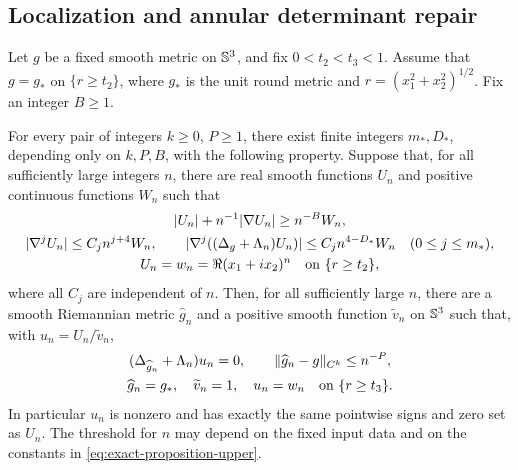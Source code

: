 \subsection{Localization and annular determinant repair}

\begin{proposition}
\label{prop:exactification}
Let \(g\) be a fixed smooth metric on \(\mathbb S^3\), and fix
\(0<t_2<t_3<1\).  Assume that \(g=g_*\) on \(\{r\ge t_2\}\), where
\(g_*\) is the unit round metric and
\(r=(x_1^2+x_2^2)^{1/2}\).  Fix an integer \(B\ge1\).

For every pair of integers \(k\ge0\), \(P\ge1\), there exist finite
integers \(m_*,D_*\), depending only on \(k,P,B\), with the following
property.  Suppose that, for all sufficiently large integers \(n\),
there are real smooth functions \(U_n\) and positive continuous
functions \(W_n\) such that
\begin{gather}
 |U_n|+n^{-1}|\nabla U_n|\ge n^{-B}W_n,
 \label{eq:exact-proposition-lower}\\
 |\nabla^jU_n|\le C_jn^{j+4}W_n,\qquad
 |\nabla^j((\Delta_g+\Lambda_n)U_n)|
 \le C_jn^{4-D_*}W_n
 \quad(0\le j\le m_*),
 \label{eq:exact-proposition-upper}\\
 U_n=w_n=\Re(x_1+ix_2)^n\quad\hbox{on }\{r\ge t_2\},
 \label{eq:exact-proposition-exterior}
\end{gather}
where all \(C_j\) are independent of \(n\).  Then, for all sufficiently
large \(n\), there are a smooth Riemannian metric \(\widehat g_n\)
and a positive smooth function \(\widetilde v_n\) on \(\mathbb S^3\) such
that, with \(u_n=U_n/\widetilde v_n\),
\begin{gather}
 (\Delta_{\widehat g_n}+\Lambda_n)u_n=0,
 \qquad \|\widehat g_n-g\|_{C^k}\le n^{-P},
 \label{eq:exact-final-equation}\\
 \widehat g_n=g_*,\quad \widetilde v_n=1,\quad u_n=w_n
 \quad\hbox{on }\{r\ge t_3\}.
 \label{eq:exact-final-exterior}
\end{gather}
In particular \(u_n\) is nonzero and has exactly the same pointwise
signs and zero set as \(U_n\).  The threshold for \(n\) may depend
on the fixed input data and on the constants in
\eqref{eq:exact-proposition-upper}.
\end{proposition}

